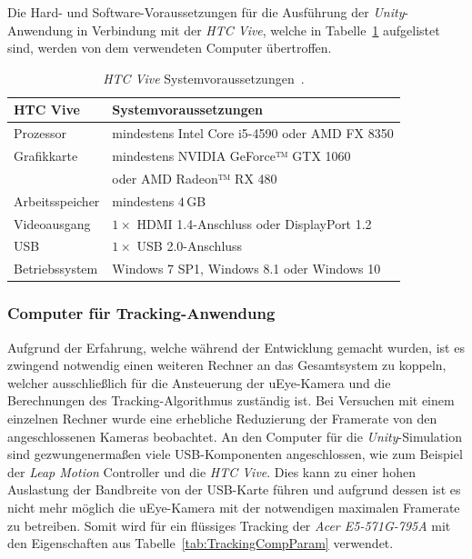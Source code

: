 Die Hard- und Software-Voraussetzungen für die Ausführung der \textit{Unity}-Anwendung in Verbindung mit der \textit{HTC Vive}, welche in Tabelle~\ref{tab:viveReq} aufgelistet sind, werden von dem verwendeten Computer übertroffen.

\begin{table}
	\centering
	\begin{tabular}{|l|l|}
		\hline
		\Absatzbox{}
		\textbf{HTC Vive}& \textbf{Systemvoraussetzungen} \\
		\hline
		Prozessor & mindestens Intel Core i5-4590 oder AMD FX 8350\\
		\hline
		Grafikkarte & mindestens NVIDIA GeForce™ GTX 1060\\
		&oder AMD Radeon™ RX 480\\
		\hline
		Arbeitsspeicher & mindestens $4\,$GB\\		
		\hline
		Videoausgang & $1\times$ HDMI 1.4-Anschluss oder DisplayPort 1.2\\
		\hline
		USB & $1\times$ USB 2.0-Anschluss\\
		\hline
		Betriebssystem & Windows 7 SP1, Windows 8.1 oder Windows 10\\
		\hline
	\end{tabular}
	\caption[\emph{HTC Vive} Systemvoraussetzungen]{\emph{HTC Vive} Systemvoraussetzungen~\cite{website:HTC_Vive_Ready}.}
	\label{tab:viveReq}
\end{table}

\subsubsection{Computer für Tracking-Anwendung}\label{sec:TrackingComp}%
Aufgrund der Erfahrung, welche während der Entwicklung gemacht wurden, ist es zwingend notwendig einen weiteren Rechner an das Gesamtsystem zu koppeln, welcher ausschließlich für die Ansteuerung der uEye-Kamera und die Berechnungen des Tracking-Algorithmus zuständig ist. Bei Versuchen mit einem einzelnen Rechner wurde eine erhebliche Reduzierung der Framerate von den angeschlossenen Kameras beobachtet.
An den Computer für die \textit{Unity}-Simulation sind gezwungenermaßen viele USB-Komponenten angeschlossen, wie zum Beispiel der \textit{Leap Motion} Controller und die \textit{HTC Vive}. Dies kann zu einer hohen Auslastung der Bandbreite von der USB-Karte führen und aufgrund dessen ist es nicht mehr möglich die uEye-Kamera mit der notwendigen maximalen Framerate zu betreiben. Somit wird für ein flüssiges  Tracking der \textit{Acer E5-571G-795A} mit den Eigenschaften aus Tabelle~\ref{tab:TrackingCompParam} verwendet.

